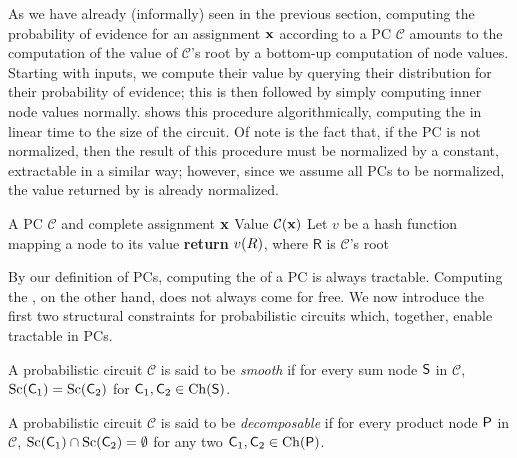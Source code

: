 As we have already (informally) seen in the previous section, computing the probability of evidence
for an assignment $\mathbf{x}$ according to a PC $\mathcal{C}$ amounts to the computation of the value
of $\mathcal{C}$'s root by a bottom-up computation of node values. Starting with inputs, we compute
their value by querying their distribution for their probability of evidence; this is then
followed by simply computing inner node values normally.  shows this procedure
algorithmically, computing the \evi{} in linear time to the size of the circuit. Of note is the
fact that, if the PC is not normalized, then the result of this procedure must be normalized by a
constant, extractable in a similar way; however, since we assume all PCs to be normalized, the
value returned by  is already normalized.

\begin{algorithm}[t]
  \caption{\evi}\label{alg:evi}
  \begin{algorithmic}[1]
    \Require A PC $\mathcal{C}$ and complete assignment $\mathbf{x}$
    \Ensure Value $\mathcal{C}(\mathbf{x})$
    \State Let $v$ be a hash function mapping a node to its value
    \EndFor%
    \State \textbf{return} $v(\normalfont{R})$, where $\textsf{R}$ is $\mathcal{C}$'s root
  \end{algorithmic}
\end{algorithm}

By our definition of PCs, computing the \evi{} of a PC is always tractable. Computing the \mar{},
on the other hand, does not always come for free. We now introduce the first two structural
constraints for probabilistic circuits which, together, enable tractable \mar{} in PCs.

\begin{definition}[Smoothness]
  A probabilistic circuit $\mathcal{C}$ is said to be \emph{smooth} if for every sum node $\operatorname{\textup{\textsf{S}}}$ in
  $\mathcal{C}$, $\operatorname*{\normalfont{Sc}}(\operatorname{\textup{\textsf{C}}}_1)=\operatorname*{\normalfont{Sc}}(\operatorname{\textup{\textsf{C}}}_2)$ for $\operatorname{\textup{\textsf{C}}}_1,\operatorname{\textup{\textsf{C}}}_2\in\operatorname*{\normalfont{Ch}}(\operatorname{\textup{\textsf{S}}})$.
\end{definition}

\begin{definition}[Decomposability]
  A probabilistic circuit $\mathcal{C}$ is said to be \emph{decomposable} if for every product node
  $\operatorname{\textup{\textsf{P}}}$ in $\mathcal{C}$, $\operatorname*{\normalfont{Sc}}(\operatorname{\textup{\textsf{C}}}_1)\cap\operatorname*{\normalfont{Sc}}(\operatorname{\textup{\textsf{C}}}_2)=\emptyset$ for any two
  $\operatorname{\textup{\textsf{C}}}_1,\operatorname{\textup{\textsf{C}}}_2\in \operatorname*{\normalfont{Ch}}(\operatorname{\textup{\textsf{P}}})$.
\end{definition}

